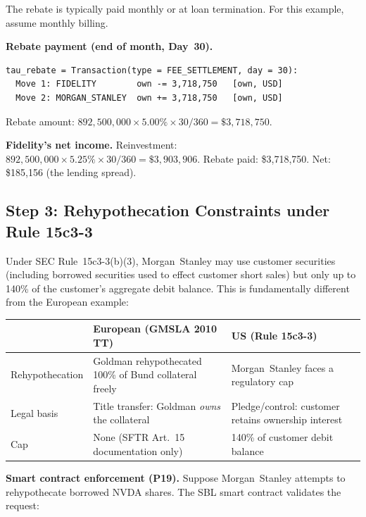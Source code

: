 \documentclass[11pt,a4paper]{article}
\begin{document}
\noindent The rebate is typically paid monthly or at loan termination. For this example, assume monthly billing.

\medskip
\noindent\textbf{Rebate payment (end of month, Day~30).}

\begin{lstlisting}
tau_rebate = Transaction(type = FEE_SETTLEMENT, day = 30):
  Move 1: FIDELITY        own -= 3,718,750   [own, USD]
  Move 2: MORGAN_STANLEY  own += 3,718,750   [own, USD]
\end{lstlisting}

\noindent Rebate amount: $892{,}500{,}000 \times 5.00\% \times 30/360 = \$3{,}718{,}750$.

\medskip
\noindent\textbf{Fidelity's net income.} Reinvestment: $892{,}500{,}000 \times 5.25\% \times 30/360 = \$3{,}903{,}906$. Rebate paid: \$3{,}718{,}750. Net: \$185{,}156 (the lending spread).

\subsection{Step 3: Rehypothecation Constraints under Rule 15c3-3}
\label{sec:us-step3}

Under SEC Rule~15c3-3(b)(3), Morgan~Stanley may use customer securities (including borrowed securities used to effect customer short sales) but only up to 140\% of the customer's aggregate debit balance. This is fundamentally different from the European example:

\begin{center}\small
\begin{tabular}{l p{5cm} p{5cm}}
\toprule
& \textbf{European (GMSLA 2010 TT)} & \textbf{US (Rule 15c3-3)} \\
\midrule
Rehypothecation & Goldman rehypothecated 100\% of Bund collateral freely & Morgan~Stanley faces a regulatory cap \\
Legal basis & Title transfer: Goldman \emph{owns} the collateral & Pledge/control: customer retains ownership interest \\
Cap & None (SFTR Art.~15 documentation only) & 140\% of customer debit balance \\
\bottomrule
\end{tabular}
\end{center}

\noindent\textbf{Smart contract enforcement (P19).} Suppose Morgan~Stanley attempts to rehypothecate borrowed NVDA shares. The SBL smart contract validates the request:
\end{document}
